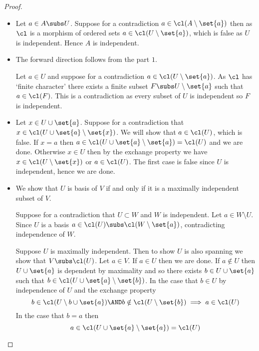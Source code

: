 \begin{proof}
    \begin{itemize}
        \item Let $a \in A \subs U$. 
        Suppose for a contradiction 
        $a \in \cl(A \setminus \set{a})$ then as $\cl$ is a morphism of 
        ordered sets $a \in \cl(U \setminus \set{a})$, 
        which is false as $U$ is independent.
        Hence $A$ is independent.
        \item The forward direction follows from the part $1$. 
        
        \begin{backward}
            Let $a \in U$ and suppose for a contradiction 
            $a \in \cl(U \setminus \set{a})$. 
            As $\cl$ has `finite character' there exists a finite subset 
            $F \subs U \setminus \set{a}$ such that $a \in \cl(F)$.
            This is a contradiction as every subset of $U$ is independent
            so $F$ is independent.
        \end{backward}

        \item Let $x \in U \cup \set{a}$.
        Suppose for a contradiction that 
        $x \in \cl(U \cup \set{a} \setminus \set{x})$.
        We will show that $a \in \cl(U)$, which is false.
        If $x = a$ then $a \in \cl(U \cup \set{a} \setminus \set{a}) = \cl(U)$
        and we are done.
        Otherwise $x \in U$ then by the exchange property
        we have $x \in \cl(U \setminus \set{x})$ or $a \in \cl(U)$.
        The first case is false since $U$ is independent,
        hence we are done.

        \item We show that $U$ is basis of $V$ if and only if it is a
            maximally independent subset of $V$.

            \begin{forward}
                Suppose for a contradiction that
                $U \subset W$ and $W$ is independent.
                Let $a \in W \setminus U$.
                Since $U$ is a basis
                $a \in \cl(U) \subs \cl(W \setminus \set{a})$,
                contradicting independence of $W$.
            \end{forward}

            \begin{backward}
                Suppose $U$ is maximally independent.
                Then to show $U$ is also spanning we show that $V \subs \cl(U)$.
                Let $a \in V$.
                If $a \in U$ then we are done.
                If $a \notin U$ then $U \cup \set{a}$ is dependent by maximality
                and so there exists $b \in U \cup \set{a}$ such that
                $b \in \cl(U \cup \set{a} \setminus \set{b})$.
                In the case that $b \in U$ by independence of $U$ and the
                exchange property
                \[b \in \cl(U \setminus {b} \cup \set{a}) \AND
                b \notin \cl(U \setminus \set{b}) \implies
                a \in \cl(U)\]
                In the case that $b = a$ then
                \[a \in \cl(U \cup \set{a} \setminus \set{a}) = \cl(U)\]
            \end{backward}


\end{itemize}
\end{proof}
